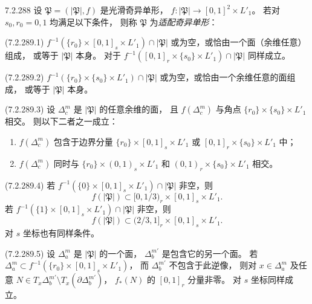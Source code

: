 \begin{definition}{7.2.288}\label{def:7-2-288}
设 $\mathfrak P=(|\mathfrak P|,f)$ 是光滑奇异单形，
$f\colon|\mathfrak P|\to[0,1]^2\times L'_1$。
若对 $s_0,r_0=0,1$ 均满足以下条件，
则称 $\mathfrak P$ 为\emph{适配奇异单形}：

\par\noindent\textup{(7.2.289.1)}
$f^{-1}(\{r_0\}\times[0,1]_s\times L'_1)
\cap|\mathfrak P|$
或为空，或恰由一个面（余维任意）组成，
或等于 $|\mathfrak P|$ 本身。
对于 $f^{-1}([0,1]_r\times\{s_0\}\times L'_1)
\cap|\mathfrak P|$ 同样成立。

\par\noindent\textup{(7.2.289.2)}
$f^{-1}(\{r_0\}\times\{s_0\}\times L'_1)
\cap|\mathfrak P|$
或为空，或恰由一个余维任意的面组成，
或等于 $|\mathfrak P|$ 本身。

\par\noindent\textup{(7.2.289.3)}
设 $\Delta_c^m$ 是 $|\mathfrak P|$ 的任意余维的面，
且 $f(\Delta_c^m)$ 与角点
$\{r_0\}\times\{s_0\}\times L'_1$ 相交。
则以下二者之一成立：
\begin{enumerate}[label=\textup{(\roman*)},leftmargin=3.5em]
\item $f(\Delta_c^m)$ 包含于边界分量
$\{r_0\}\times[0,1]_s\times L'_1$
或 $[0,1]_r\times\{s_0\}\times L'_1$ 中；
\item $f(\Delta_c^m)$ 同时与
$\{r_0\}\times(0,1)_s\times L'_1$ 和
$(0,1)_r\times\{s_0\}\times L'_1$ 相交。
\end{enumerate}

\par\noindent\textup{(7.2.289.4)}
若 $f^{-1}(\{0\}\times[0,1]_s\times L'_1)
\cap|\mathfrak P|$ 非空，则
\[
f(|\mathfrak P|)\subset
[0,1/3)_r\times[0,1]_s\times L'_1.
\]
若 $f^{-1}(\{1\}\times[0,1]_s\times L'_1)
\cap|\mathfrak P|$ 非空，则
\[
f(|\mathfrak P|)\subset
(2/3,1]_r\times[0,1]_s\times L'_1.
\]
对 $s$ 坐标也有同样条件。

\par\noindent\textup{(7.2.289.5)}
设 $\Delta_a^m$ 是 $|\mathfrak P|$ 的一个面，
$\Delta_b^{m'}$ 是包含它的另一个面。
若 $\Delta_a^m\subset
f^{-1}(\{r_0\}\times[0,1]_s\times L'_1)$，
而 $\Delta_b^{m'}$ 不包含于此逆像，
则对 $x\in\Delta_a^m$ 及任意
$N\in T_x\Delta_b^{m'}\setminus
T_x(\partial\Delta_b^{m'})$，
$f_*(N)$ 的 $[0,1]_r$ 分量非零。
对 $s$ 坐标同样成立。
\end{definition}

